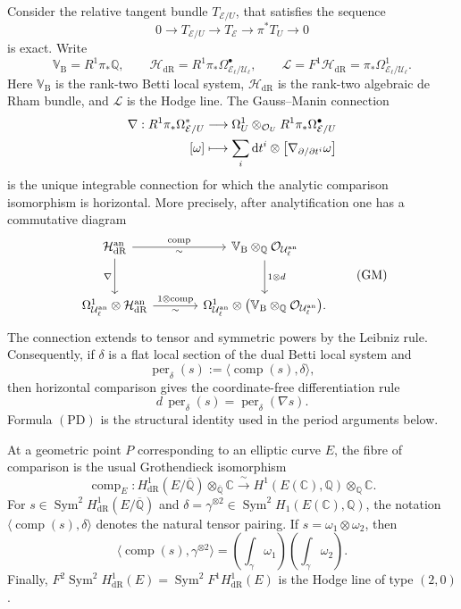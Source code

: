 \documentclass[11pt,a4paper]{amsart} %
\theoremstyle{definition}
\newcommand{\Q}{\mathbb Q}
\newcommand{\Qbar}{\overline{\mathbb Q}}
\newcommand{\C}{\mathbb C}
\newcommand{\Sym}{\operatorname{Sym}}
\newcommand{\dR}{\mathrm{dR}}
\newcommand{\Betti}{\mathrm B}
\begin{document}
Consider the relative tangent bundle $T_{\mathcal E/U}$, that satisfies the sequence \[0\longrightarrow T_{\mathcal E/U}\longrightarrow T_{\mathcal E}\longrightarrow\pi^*T_U\longrightarrow0\] is exact. Write
\[
\mathbb V_{\Betti}=R^1\pi_*\Q,
\qquad
\mathcal H_{\dR}=R^1\pi_*\Omega^\bullet_{\mathcal E_\ell/\mathcal U_\ell},
\qquad
\mathcal L=F^1\mathcal H_{\dR}
=\pi_*\Omega^1_{\mathcal E_\ell/\mathcal U_\ell}.
\]
Here \(\mathbb V_{\Betti}\) is the rank-two Betti local system,
\(\mathcal H_{\dR}\) is the rank-two algebraic de Rham bundle, and
\(\mathcal L\) is the Hodge line. The Gauss--Manin connection
\begin{align*}
\nabla:R^1\pi_\ast\Omega_{\mathcal E/U}^\ast&\longrightarrow \Omega^1_U\otimes _{\mathcal O_U}R^1\pi_\ast\Omega_{\mathcal E/U}^\bullet\\
 [\omega]&\longmapsto \sum_i {\rm d}t^i\otimes \left[\nabla_{\partial /\partial t^i}\omega\right]
\end{align*}
is the unique integrable connection for which the analytic comparison
isomorphism is horizontal. More precisely, after analytification one has a
commutative diagram
\[
\begin{tikzcd}[column sep=large,row sep=large]
\mathcal H_{\dR}^{\mathrm{an}}
  \arrow[r,"\operatorname{comp}","\sim"']
  \arrow[d,"\nabla"']
& \mathbb V_{\Betti}\otimes_\Q
  \mathcal O_{\mathcal U_\ell^{\mathrm{an}}}
  \arrow[d,"1\otimes d"]\\
\Omega^1_{\mathcal U_\ell^{\mathrm{an}}}\otimes
  \mathcal H_{\dR}^{\mathrm{an}}
  \arrow[r,"1\otimes\operatorname{comp}","\sim"']
& \Omega^1_{\mathcal U_\ell^{\mathrm{an}}}\otimes
  \bigl(\mathbb V_{\Betti}\otimes_\Q
  \mathcal O_{\mathcal U_\ell^{\mathrm{an}}}\bigr).
\end{tikzcd}
\tag{GM}
\]
The connection extends to tensor and symmetric powers by the Leibniz rule.
Consequently, if \(\delta\) is a flat local section of the dual Betti local
system and
\[
\operatorname{per}_\delta(s)
:=\langle\operatorname{comp}(s),\delta\rangle,
\]
then horizontal comparison gives the coordinate-free differentiation rule
\[
d\,\operatorname{per}_\delta(s)
=\operatorname{per}_\delta(\nabla s).
\tag{PD}
\]
Formula \((\mathrm{PD})\) is the structural identity used in the period
arguments below.

At a geometric point \(P\) corresponding to an elliptic curve \(E\), the
fibre of comparison is the usual Grothendieck isomorphism
\[
\operatorname{comp}_E:
H^1_{\dR}(E/\Qbar)\otimes_{\Qbar}\C
\xrightarrow{\ \sim\ }
H^1(E(\C),\Q)\otimes_\Q\C.
\]
For \(s\in\Sym^2H^1_{\dR}(E/\Qbar)\) and
\(\delta=\gamma^{\otimes2}\in\Sym^2H_1(E(\C),\Q)\), the notation
\(\langle\operatorname{comp}(s),\delta\rangle\) denotes the natural tensor
pairing. If \(s=\omega_1\otimes\omega_2\), then
\[
\langle\operatorname{comp}(s),\gamma^{\otimes2}\rangle
=
\left(\int_\gamma\omega_1\right)
\left(\int_\gamma\omega_2\right).
\]
Finally,
\(F^2\Sym^2H^1_{\dR}(E)=\Sym^2F^1H^1_{\dR}(E)\) is the Hodge line of type
\((2,0)\).
\end{document}
